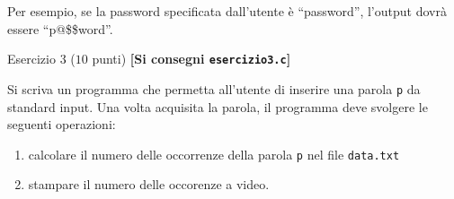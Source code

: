 \documentclass[12pt]{article}
\begin{document}
Per esempio, se la password specificata dall'utente \`e ``password'', l'output dovr\`a essere ``p@\$\$word''.

\vspace*{2ex}
\begin{center}{\Large Esercizio 3} ($10$ punti) \textbf{[Si consegni \texttt{esercizio3.c}]}\end{center}

Si scriva un programma che permetta all'utente di inserire una parola \texttt{p} da standard input.
Una volta acquisita la parola, il programma deve svolgere le seguenti operazioni:
\begin{enumerate}
	\item calcolare il numero delle occorrenze della parola \texttt{p} nel file \texttt{data.txt}
	\item stampare il numero delle occorenze a video.
\end{enumerate} 
\end{document}
